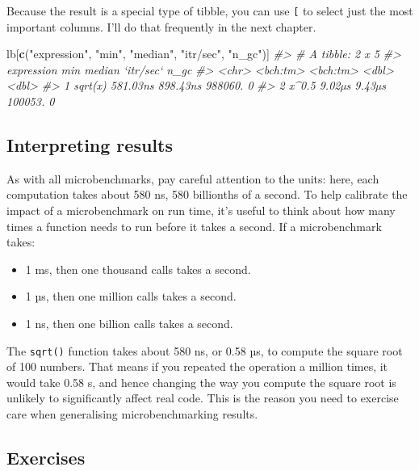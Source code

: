 \documentclass[]{book}
\newenvironment{Shaded}{\begin{snugshade}}{\end{snugshade}}
\newcommand{\CommentTok}[1]{\textcolor[rgb]{0.37,0.37,0.37}{\textit{#1}}}
\newcommand{\KeywordTok}[1]{\textcolor[rgb]{0.27,0.27,0.27}{\textbf{#1}}}
\newcommand{\NormalTok}[1]{#1}
\newcommand{\StringTok}[1]{\textcolor[rgb]{0.5,0.5,0.5}{#1}}
\providecommand{\tightlist}{%
  \setlength{\itemsep}{0pt}\setlength{\parskip}{0pt}}
\begin{document}
Because the result is a special type of tibble, you can use \texttt{{[}} to select just the most important columns. I'll do that frequently in the next chapter.

\begin{Shaded}
\begin{Highlighting}[]
\NormalTok{lb[}\KeywordTok{c}\NormalTok{(}\StringTok{"expression"}\NormalTok{, }\StringTok{"min"}\NormalTok{, }\StringTok{"median"}\NormalTok{, }\StringTok{"itr/sec"}\NormalTok{, }\StringTok{"n_gc"}\NormalTok{)]}
\CommentTok{#> # A tibble: 2 x 5}
\CommentTok{#>   expression      min   median `itr/sec`  n_gc}
\CommentTok{#>   <chr>      <bch:tm> <bch:tm>     <dbl> <dbl>}
\CommentTok{#> 1 sqrt(x)    581.03ns 898.43ns   988060.     0}
\CommentTok{#> 2 x^0.5        9.02µs   9.43µs   100053.     0}
\end{Highlighting}
\end{Shaded}

\hypertarget{interpreting-results}{%
\subsection{Interpreting results}\label{interpreting-results}}

As with all microbenchmarks, pay careful attention to the units: here, each computation takes about 580 ns, 580 billionths of a second. To help calibrate the impact of a microbenchmark on run time, it's useful to think about how many times a function needs to run before it takes a second. If a microbenchmark takes:

\begin{itemize}
\tightlist
\item
  1 ms, then one thousand calls takes a second.
\item
  1 µs, then one million calls takes a second.
\item
  1 ns, then one billion calls takes a second.
\end{itemize}

The \texttt{sqrt()} function takes about 580 ns, or 0.58 µs, to compute the square root of 100 numbers. That means if you repeated the operation a million times, it would take 0.58 s, and hence changing the way you compute the square root is unlikely to significantly affect real code. This is the reason you need to exercise care when generalising microbenchmarking results.

\hypertarget{exercises-17}{%
\subsection{Exercises}\label{exercises-17}}
\end{document}
